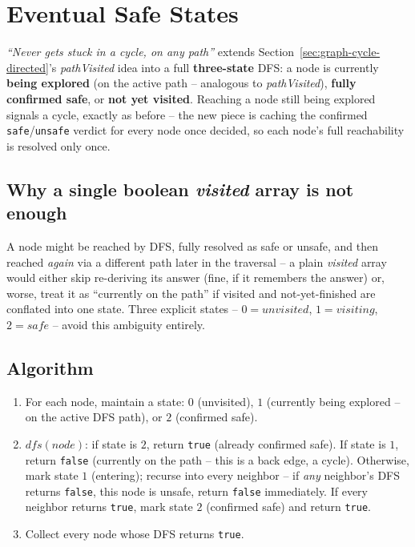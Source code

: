 \section{Eventual Safe States}
\label{sec:graph-eventual-safe-states}


\begin{patternbox}
\emph{``Never gets stuck in a cycle, on any path''} extends
Section~\ref{sec:graph-cycle-directed}'s \textit{pathVisited} idea into
a full \textbf{three-state} DFS: a node is currently
\textbf{being explored} (on the active path -- analogous to
\textit{pathVisited}), \textbf{fully confirmed safe}, or
\textbf{not yet visited}. Reaching a node still being explored signals
a cycle, exactly as before -- the new piece is caching the confirmed
\texttt{safe}/\texttt{unsafe} verdict for every node once decided, so
each node's full reachability is resolved only once.
\end{patternbox}

\subsection*{Why a single boolean \textit{visited} array is not enough}

A node might be reached by DFS, fully resolved as safe or unsafe, and
then reached \emph{again} via a different path later in the traversal
-- a plain \textit{visited} array would either skip re-deriving its
answer (fine, if it remembers the answer) or, worse, treat it as
``currently on the path'' if visited and not-yet-finished are
conflated into one state. Three explicit states --
$0=\textit{unvisited}$, $1=\textit{visiting}$, $2=\textit{safe}$ --
avoid this ambiguity entirely.

\subsection*{Algorithm}

\begin{enumerate}
  \item For each node, maintain a state: $0$ (unvisited), $1$
        (currently being explored -- on the active DFS path), or $2$
        (confirmed safe).
  \item $\textit{dfs}(\textit{node})$: if state is $2$, return
        \texttt{true} (already confirmed safe). If state is $1$,
        return \texttt{false} (currently on the path -- this is a back
        edge, a cycle). Otherwise, mark state $1$ (entering); recurse
        into every neighbor -- if \emph{any} neighbor's DFS returns
        \texttt{false}, this node is unsafe, return \texttt{false}
        immediately. If every neighbor returns \texttt{true}, mark
        state $2$ (confirmed safe) and return \texttt{true}.
  \item Collect every node whose DFS returns \texttt{true}.
\end{enumerate}

